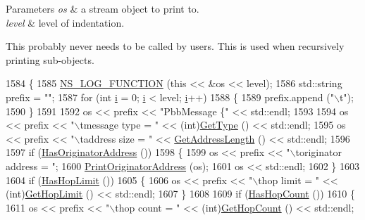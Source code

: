 \begin{DoxyParams}{Parameters}
{\em os} & a stream object to print to. \\
\hline
{\em level} & level of indentation.\\
\hline
\end{DoxyParams}
This probably never needs to be called by users. This is used when recursively printing sub-\/objects. 
\begin{DoxyCode}
1584 \{
1585   \hyperlink{log-macros-disabled_8h_a90b90d5bad1f39cb1b64923ea94c0761}{NS\_LOG\_FUNCTION} (\textcolor{keyword}{this} << &os << level);
1586   std::string prefix = \textcolor{stringliteral}{""};
1587   \textcolor{keywordflow}{for} (\textcolor{keywordtype}{int} \hyperlink{bernuolliDistribution_8m_a6f6ccfcf58b31cb6412107d9d5281426}{i} = 0; \hyperlink{bernuolliDistribution_8m_a6f6ccfcf58b31cb6412107d9d5281426}{i} < level; \hyperlink{bernuolliDistribution_8m_a6f6ccfcf58b31cb6412107d9d5281426}{i}++)
1588     \{
1589       prefix.append (\textcolor{stringliteral}{"\(\backslash\)t"});
1590     \}
1591 
1592   os << prefix << \textcolor{stringliteral}{"PbbMessage \{"} << std::endl;
1593 
1594   os << prefix << \textcolor{stringliteral}{"\(\backslash\)tmessage type = "} << (int)\hyperlink{classns3_1_1PbbMessage_ad720b67118bbe16669019b7344903cd9}{GetType} () << std::endl;
1595   os << prefix << \textcolor{stringliteral}{"\(\backslash\)taddress size = "} << \hyperlink{classns3_1_1PbbMessage_abc3011e4ca197ddc8ae7a9a1f18d779f}{GetAddressLength} () << std::endl;
1596 
1597   \textcolor{keywordflow}{if} (\hyperlink{classns3_1_1PbbMessage_a7d64dd0abb8306bb13cb6f1124f35c3c}{HasOriginatorAddress} ())
1598     \{
1599       os << prefix << \textcolor{stringliteral}{"\(\backslash\)toriginator address = "};
1600       \hyperlink{classns3_1_1PbbMessage_a71ae17a7cdc07aa1736f0e3b8fd20658}{PrintOriginatorAddress} (os);
1601       os << std::endl;
1602     \}
1603 
1604   \textcolor{keywordflow}{if} (\hyperlink{classns3_1_1PbbMessage_a5bad52e536a9a2116a7f66b3c8d2054b}{HasHopLimit} ())
1605     \{
1606       os << prefix << \textcolor{stringliteral}{"\(\backslash\)thop limit = "} << (int)\hyperlink{classns3_1_1PbbMessage_a938893c819b1f04baa8738cbc3ea6d19}{GetHopLimit} () << std::endl;
1607     \}
1608 
1609   \textcolor{keywordflow}{if} (\hyperlink{classns3_1_1PbbMessage_ac6c535503fda3849f8ab99792416efd2}{HasHopCount} ())
1610     \{
1611       os << prefix << \textcolor{stringliteral}{"\(\backslash\)thop count = "} << (int)\hyperlink{classns3_1_1PbbMessage_a1941a4d881175d211f12970b54ceb483}{GetHopCount} () << std::endl;

\end{DoxyCode}
